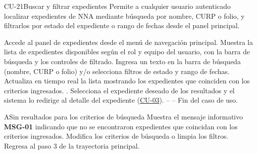 \begin{UseCase}{CU-21}{Buscar y filtrar expedientes}{
	Permite a cualquier usuario autenticado localizar expedientes de NNA mediante búsqueda por nombre, CURP o folio, y filtrarlos por estado del expediente o rango de fechas desde el panel principal.
}
\end{UseCase}

\begin{UCtrayectoria}
	\UCpaso[\UCactor] Accede al panel de expedientes desde el menú de navegación principal.
	\UCpaso Muestra la lista de expedientes disponibles según el rol y equipo del usuario, con la barra de búsqueda y los controles de filtrado.
	\UCpaso[\UCactor] Ingresa un texto en la barra de búsqueda (nombre, CURP o folio) y/o selecciona filtros de estado y rango de fechas.
	\UCpaso Actualiza en tiempo real la lista mostrando los expedientes que coinciden con los criterios ingresados. .
	\UCpaso[\UCactor] Selecciona el expediente deseado de los resultados y el sistema lo redirige al detalle del expediente ({\hyperlink{CU-03}{CU-03}}).
	\UCpaso[] -- -- Fin del caso de uso.
\end{UCtrayectoria}

\begin{UCtrayectoriaA}{A}{Sin resultados para los criterios de búsqueda}
	\UCpaso Muestra el mensaje informativo \textbf{MSG-01} indicando que no se encontraron expedientes que coincidan con los criterios ingresados.
	\UCpaso[\UCactor] Modifica los criterios de búsqueda o limpia los filtros.
	\UCpaso Regresa al paso 3 de la trayectoria principal.
\end{UCtrayectoriaA}


